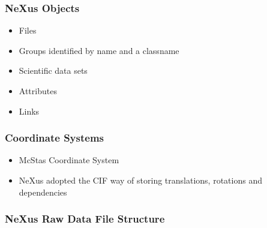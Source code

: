 \documentclass{beamer}
\begin{document}
\begin{frame} \frametitle{NeXus Objects}
\begin{itemize}
\item Files
\item Groups identified by name and a classname
\item Scientific data sets
\item Attributes
\item Links
\end{itemize}
\end{frame}

\begin{frame} \frametitle{Coordinate Systems}
\begin{itemize}
\item McStas Coordinate System
\item NeXus adopted the CIF way of storing translations, rotations and dependencies
\end{itemize}
\begin{figure}[!ht]
\end{figure}
\end{frame}


\begin{frame} \frametitle{NeXus Raw Data File Structure}
\begin{figure}[!ht]
\end{figure}
\end{frame}
\end{document}

